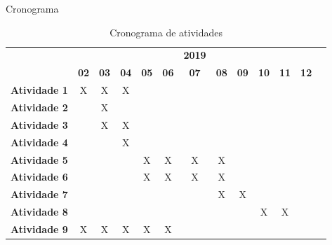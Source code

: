 
\begin{frame}{Cronograma }
  \ \  \\[0.1cm]
  \begin{minipage}[b]{0.9\linewidth}
\begin{table}[h!]
\begin{center}
\caption{Cronograma de atividades}
\label{tab:cronograma}
\begin{small}
\begin{tabular}{p{5cm}cccccccccccc}
  \toprule
  & &  &  & &  & \textbf{2019}  & &  &  &  &  & \\
                                        & \textbf{02} & \textbf{03} & \textbf{04} & \textbf{05} & \textbf{06} & \textbf{07} & \textbf{08} & \textbf{09} & \textbf{10} & \textbf{11} & \textbf{12} \\
  \midrule

  \textbf{Atividade 1}                     &      X      &      X      &      X      &           &             &             &             &             &             &             &             \\
  \textbf{Atividade 2} &             &      X      &            &             &             &             &             &             &             &             &             \\
  \textbf{Atividade 3}         &             &     X        &    X         &            &            &            &            &            &             &             &             \\
  \textbf{Atividade 4}         &             &             &    X         &            &            &            &            &            &             &             &             \\
  \textbf{Atividade 5}         &             &             &             &      X      &       X     &   X         &     X       &            &             &             &             \\
  \textbf{Atividade 6}         &             &             &             &      X      &     X       &     X       &    X        &            &             &             &             \\
  \textbf{Atividade 7}         &             &             &             &            &            &            &      X      &      X      &             &             &             \\
  \textbf{Atividade 8}         &             &             &             &            &            &            &           &            &   X          &      X       &             \\
  \textbf{Atividade 9}          &      X      &      X      &      X      &      X      &      X      &             &             &             &             &             &             \\


\end{tabular}
\end{small}
\end{center}
\end{table}
\end{minipage}
\end{frame}
